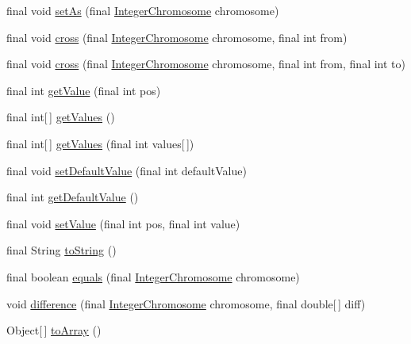 \begin{DoxyCompactItemize}
\item 
final void \hyperlink{classjenes_1_1chromosome_1_1_integer_chromosome_a65b39a2a6ef3deb1cb107b7f474bcbb0}{set\-As} (final \hyperlink{classjenes_1_1chromosome_1_1_integer_chromosome}{Integer\-Chromosome} chromosome)
\item 
final void \hyperlink{classjenes_1_1chromosome_1_1_integer_chromosome_a36acf5fbdfbb8a2718ade474188248d4}{cross} (final \hyperlink{classjenes_1_1chromosome_1_1_integer_chromosome}{Integer\-Chromosome} chromosome, final int from)
\item 
final void \hyperlink{classjenes_1_1chromosome_1_1_integer_chromosome_adfb0865b40586caf2d78a7d2d58c7796}{cross} (final \hyperlink{classjenes_1_1chromosome_1_1_integer_chromosome}{Integer\-Chromosome} chromosome, final int from, final int to)
\item 
final int \hyperlink{classjenes_1_1chromosome_1_1_integer_chromosome_a5bc96e2224ca980bd9e13e0416426e1d}{get\-Value} (final int pos)
\item 
final int\mbox{[}$\,$\mbox{]} \hyperlink{classjenes_1_1chromosome_1_1_integer_chromosome_aa9e195726837440d8b65c9fc4268624c}{get\-Values} ()
\item 
final int\mbox{[}$\,$\mbox{]} \hyperlink{classjenes_1_1chromosome_1_1_integer_chromosome_adc4af1dfafa5c20d92ee91a79d289317}{get\-Values} (final int values\mbox{[}$\,$\mbox{]})
\item 
final void \hyperlink{classjenes_1_1chromosome_1_1_integer_chromosome_a682f03e84e51f0e132a657b25236d432}{set\-Default\-Value} (final int default\-Value)
\item 
final int \hyperlink{classjenes_1_1chromosome_1_1_integer_chromosome_aac608f3599a9289d510e0ee7bc34fbc9}{get\-Default\-Value} ()
\item 
final void \hyperlink{classjenes_1_1chromosome_1_1_integer_chromosome_a2d2aa7705d11a8ca21493c82bf334f74}{set\-Value} (final int pos, final int value)
\item 
final String \hyperlink{classjenes_1_1chromosome_1_1_integer_chromosome_aac7f634cd0b9449d2db45a87a0773ba3}{to\-String} ()
\item 
final boolean \hyperlink{classjenes_1_1chromosome_1_1_integer_chromosome_a58904190bf6c0d3f3b34dd584dab91b7}{equals} (final \hyperlink{classjenes_1_1chromosome_1_1_integer_chromosome}{Integer\-Chromosome} chromosome)
\item 
void \hyperlink{classjenes_1_1chromosome_1_1_integer_chromosome_a69f90fc799f3d0534bc32f6f509f89fc}{difference} (final \hyperlink{classjenes_1_1chromosome_1_1_integer_chromosome}{Integer\-Chromosome} chromosome, final double\mbox{[}$\,$\mbox{]} diff)
\item 
Object\mbox{[}$\,$\mbox{]} \hyperlink{classjenes_1_1chromosome_1_1_integer_chromosome_ac1fa490d6a64bcd765982f57235fb04a}{to\-Array} ()
\end{DoxyCompactItemize}


